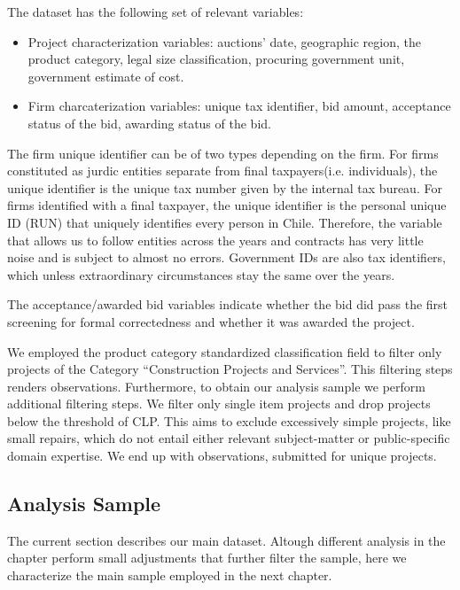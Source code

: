The dataset has the following set of relevant variables:
\begin{itemize}
  \item Project characterization variables: auctions’ date, geographic region, the product category, legal size classification, procuring government unit, government estimate of cost.
  \item Firm charcaterization variables: unique tax identifier, bid amount, acceptance status of the bid, awarding status of the bid.
\end{itemize}

The firm unique identifier can be of two types depending on the firm. For firms constituted as jurdic entities separate from final taxpayers(i.e. individuals), the unique identifier is the unique tax number given by the internal tax bureau. For firms identified with a final taxpayer, the unique identifier is the personal unique ID (RUN) that uniquely identifies every person in Chile. Therefore, the variable that allows us to follow entities across the years and contracts has very little noise and is subject to almost no errors. Government IDs are also tax identifiers, which unless extraordinary circumstances stay the same over the years.

The acceptance/awarded bid variables indicate whether the bid did pass the first screening for formal correctedness and whether it was awarded the project.

We  employed the product category standardized classification field to filter only projects of the Category “Construction Projects and Services”. This filtering steps renders observations. Furthermore, to obtain our analysis sample we perform additional filtering steps. We filter only single item projects and drop projects below the threshold of CLP. This aims to exclude excessively simple projects, like small repairs, which do not entail either relevant subject-matter or public-specific domain expertise. We end up with observations, submitted for unique projects.

\subsection{Analysis Sample}
The current section describes our main dataset. Altough different analysis in the chapter perform small adjustments that further filter the sample, here we characterize the main sample employed in the next chapter.

